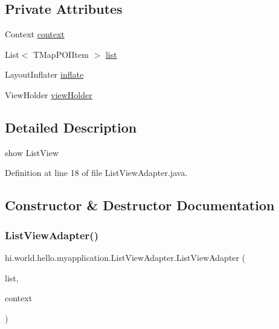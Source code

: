 \subsection*{Private Attributes}
\begin{DoxyCompactItemize}
\item 
Context \mbox{\hyperlink{classhi_1_1world_1_1hello_1_1myapplication_1_1_list_view_adapter_a71fc8d65a832fec714a0ea56c63536fe}{context}}
\item 
List$<$ T\+Map\+P\+O\+I\+Item $>$ \mbox{\hyperlink{classhi_1_1world_1_1hello_1_1myapplication_1_1_list_view_adapter_adbc7d93004ca3fd896d3aa34fea5aec0}{list}}
\item 
Layout\+Inflater \mbox{\hyperlink{classhi_1_1world_1_1hello_1_1myapplication_1_1_list_view_adapter_a2f107aeb42c7961588be8ad1c20e93c3}{inflate}}
\item 
View\+Holder \mbox{\hyperlink{classhi_1_1world_1_1hello_1_1myapplication_1_1_list_view_adapter_a90d289e2054c3deb8a8c2c80abdd5ba1}{view\+Holder}}
\end{DoxyCompactItemize}


\subsection{Detailed Description}
show List\+View 

Definition at line 18 of file List\+View\+Adapter.\+java.



\subsection{Constructor \& Destructor Documentation}
\mbox{\label{classhi_1_1world_1_1hello_1_1myapplication_1_1_list_view_adapter_ac7ae7f029134c2281c453b8e449365d6}} 
\subsubsection{\texorpdfstring{ListViewAdapter()}{ListViewAdapter()}}
{\footnotesize\ttfamily hi.\+world.\+hello.\+myapplication.\+List\+View\+Adapter.\+List\+View\+Adapter (\begin{DoxyParamCaption}\item[{List$<$ T\+Map\+P\+O\+I\+Item $>$}]{list,  }\item[{Context}]{context }\end{DoxyParamCaption})}




